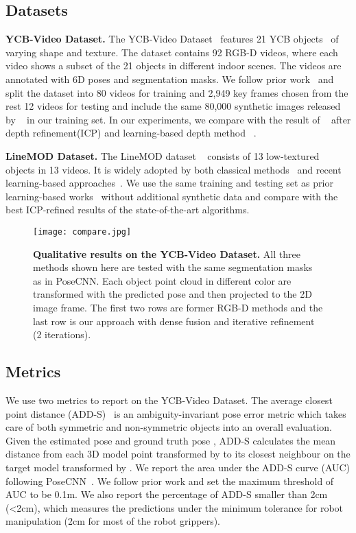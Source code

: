 \documentclass[10pt,twocolumn,letterpaper]{article}
\begin{document}
\subsection{Datasets}
\label{ssec:dsm}

\noindent\textbf{YCB-Video Dataset.} The YCB-Video Dataset~\citet{xiang2017posecnn} features 21 YCB objects~\citet{alli2015TheYO} of varying shape and texture. The dataset contains 92 RGB-D videos, where each video shows a subset of the 21 objects in different indoor scenes. The videos are annotated with 6D poses and segmentation masks. We follow prior work~\cite{xiang2017posecnn} and split the dataset into 80 videos for training and 2,949 key frames chosen from the rest 12 videos for testing and include the same 80,000 synthetic images released by ~\cite{xiang2017posecnn} in our training set. In our experiments, we compare with the result of ~\cite{xiang2017posecnn} after depth refinement(ICP) and learning-based depth method ~\cite{xu2017pointfusion}.

\noindent\textbf{LineMOD Dataset.}
The LineMOD dataset ~\citet{Hinterstoier2011MultimodalTF} consists of 13 low-textured objects in 13 videos. It is widely adopted by both classical methods~\cite{vidal20186d, drost2010model, buch2017rotational} and recent learning-based approaches~\cite{sundermeyer2018implicit, tekin18, li2018deepim}. We use the same training and testing set as prior learning-based works~\cite{rad2017bb8, tekin18, li2018deepim} without additional synthetic data and compare with the best ICP-refined results of the state-of-the-art algorithms.

\begin{figure*}[ht]
	\centering
	\texttt{[image: compare.jpg]}
	\caption{\textbf{Qualitative results on the YCB-Video Dataset.} All three methods shown here are tested with the same segmentation masks as in PoseCNN. Each object point cloud in different color are transformed with the predicted pose and then projected to the 2D image frame. The first two rows are former RGB-D methods and the last row is our approach with dense fusion and iterative refinement (2 iterations).}
	\label{exp:qualitative_ycb}
\end{figure*}

\subsection{Metrics}
\label{ssec:met}

We use two metrics to report on the YCB-Video Dataset. The average closest point distance (ADD-S)~\cite{xiang2017posecnn} is an ambiguity-invariant pose error metric which takes care of both symmetric and non-symmetric objects into an overall evaluation. Given the estimated pose  and ground truth pose , ADD-S calculates the mean distance from each 3D model point transformed by  to its closest neighbour on the target model transformed by . We report the area under the ADD-S curve (AUC) following PoseCNN~\cite{xiang2017posecnn}. We follow prior work and set the maximum threshold of AUC to be 0.1m. We also report the percentage of ADD-S smaller than 2cm (\textless{}2cm), which measures the predictions under the minimum tolerance for robot manipulation (2cm for most of the robot grippers).
\end{document}

